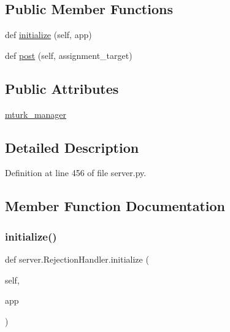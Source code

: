 \subsection*{Public Member Functions}
\begin{DoxyCompactItemize}
\item 
def \hyperlink{classserver_1_1RejectionHandler_a98dcd17eefb6470ba2a8ab9363b81422}{initialize} (self, app)
\item 
def \hyperlink{classserver_1_1RejectionHandler_ac442a5bf81064a282b5f2ff706ab5b6b}{post} (self, assignment\+\_\+target)
\end{DoxyCompactItemize}
\subsection*{Public Attributes}
\begin{DoxyCompactItemize}
\item 
\hyperlink{classserver_1_1RejectionHandler_af3a107fe511028a0c1ac4a9eee90f68c}{mturk\+\_\+manager}
\end{DoxyCompactItemize}


\subsection{Detailed Description}


Definition at line 456 of file server.\+py.



\subsection{Member Function Documentation}
\mbox{\label{classserver_1_1RejectionHandler_a98dcd17eefb6470ba2a8ab9363b81422}} 
\subsubsection{\texorpdfstring{initialize()}{initialize()}}
{\footnotesize\ttfamily def server.\+Rejection\+Handler.\+initialize (\begin{DoxyParamCaption}\item[{}]{self,  }\item[{}]{app }\end{DoxyParamCaption})}



